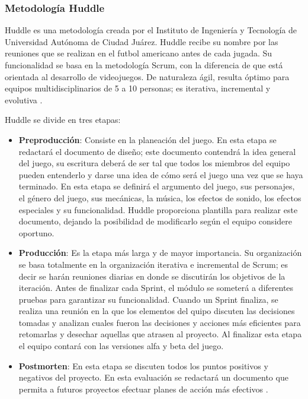 \subsubsection{Metodología Huddle}
Huddle es una metodología creada por el Instituto de Ingeniería y Tecnología de
 Universidad Autónoma de Ciudad Juárez. Huddle recibe su nombre por las reuniones 
 que se realizan en el futbol americano antes de cada jugada. Su funcionalidad 
 se basa en la metodología Scrum, con la diferencia de que está orientada al
  desarrollo de videojuegos.  De naturaleza ágil, resulta óptimo para equipos 
  multidisciplinarios de 5 a 10 personas; es iterativa, incremental y evolutiva 
  \cite{Ref_Huddle}.
\\
\par
Huddle se divide en tres etapas: 
	\begin{itemize}
		\item \textbf{Preproducción}: Consiste en la planeación del juego. En esta etapa 
		se redactará el documento de diseño; este documento contendrá la idea 
		general del juego, su escritura deberá de ser tal que todos los miembros 
		del equipo pueden entenderlo y darse una idea de cómo será el juego una vez 
		que se haya terminado. En esta etapa se definirá el argumento del juego, 
		sus personajes, el género del juego, sus mecánicas, la música, los efectos de 
		sonido, los efectos especiales y su funcionalidad. Huddle proporciona 
		plantilla para realizar este documento, dejando la posibilidad de 
		modificarlo según el equipo considere oportuno.
		\item \textbf{Producción}: Es la etapa más larga y de mayor importancia. Su 
		organización se basa totalmente en la organización iterativa e incremental 
		de Scrum; es decir se harán reuniones diarias en donde se discutirán los 
		objetivos de la iteración. Antes de finalizar cada Sprint, el módulo se someterá 
		a diferentes pruebas para garantizar su funcionalidad. Cuando un Sprint 
		finaliza, se realiza una reunión en la que los elementos del quipo discuten las 
		decisiones tomadas y analizan cuales fueron las decisiones y acciones más 
		eficientes para retomarlas y desechar aquellas que atrasen al proyecto. Al 
		finalizar esta etapa el equipo contará con las versiones alfa y beta del juego. 
		\item \textbf{Postmorten}: En esta etapa se discuten todos los puntos positivos 
		y negativos del proyecto. En esta evaluación se redactará un documento que 
		permita a futuros proyectos efectuar planes de acción más efectivos
		\cite{Ref_Huddle}.
	\end{itemize}

